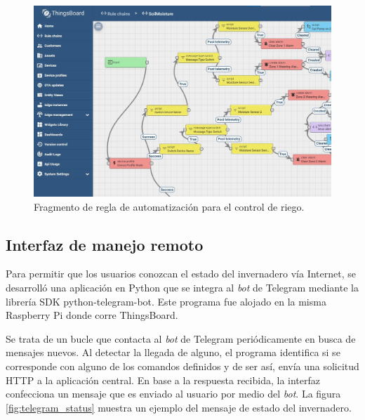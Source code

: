 \begin{figure}[!h]
	\centering
	\includegraphics[width=1\textwidth]{./Figures/chapter3/TB_Rule_Soil 2.jpg}
	\caption[Fragmento de regla de automatización para el control de riego]{Fragmento de regla de automatización para el control de riego.}
	\label{fig:rule_riego}
\end{figure}

\subsection{Interfaz de manejo remoto}
\label{sec:Interfaz de manejo remoto}



Para permitir que los usuarios conozcan el estado del invernadero vía Internet, se desarrolló una aplicación en Python que se integra al \textit{bot} de Telegram mediante la librería SDK python-telegram-bot. Este programa fue alojado en la misma Raspberry Pi donde corre ThingsBoard.


Se trata de un bucle que contacta al \textit{bot} de Telegram periódicamente en busca de mensajes nuevos. Al detectar la llegada de alguno, el programa identifica si se corresponde con alguno de los comandos definidos y de ser así, envía una solicitud HTTP a la aplicación central. En base a la respuesta recibida, la interfaz confecciona un mensaje que es enviado al usuario por medio del \textit{bot}. La figura \ref{fig:telegram_status} muestra un ejemplo del mensaje de estado del invernadero.

